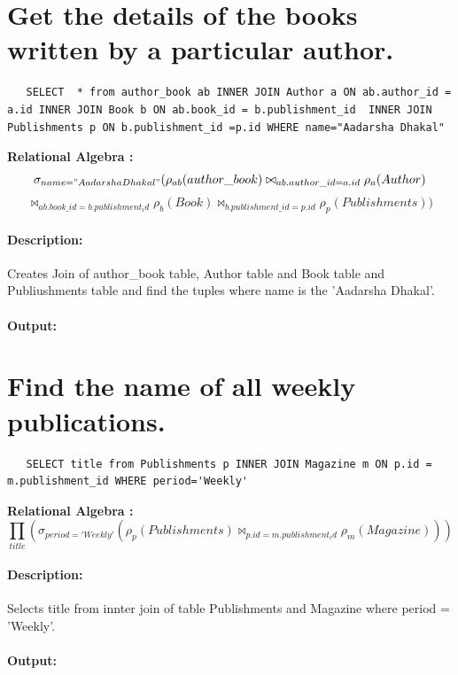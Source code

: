 \documentclass{report}
\begin{document}
\section{Get the details of the books written by a particular author.}
\begin{lstlisting}
   SELECT  * from author_book ab INNER JOIN Author a ON ab.author_id = a.id INNER JOIN Book b ON ab.book_id = b.publishment_id  INNER JOIN Publishments p ON b.publishment_id =p.id WHERE name="Aadarsha Dhakal"
\end{lstlisting}
\vspace{0.5cm}
\textbf{Relational Algebra :} \[ \sigma_{name = "Aadarsha Dhakal"}  ( \rho_{ab}(author\_book) \bowtie_{ab.author\_id = a.id} \rho_a(Author)\]\[ \bowtie_{ab.book\_id = b.publishment_id} \rho_b(Book) \bowtie_{b.publishment\_id = p.id} \rho_p(Publishments) ) \]
\paragraph{Description: }
Creates Join of author\_book table, Author table and Book table and Publiushments table and find the tuples where name is the 'Aadarsha Dhakal'.

\paragraph{Output: }




\section{Find the name of all weekly publications. }
\begin{lstlisting}
   SELECT title from Publishments p INNER JOIN Magazine m ON p.id = m.publishment_id WHERE period='Weekly'
\end{lstlisting}
\vspace{0.5cm}
\textbf{Relational Algebra :} \[ \prod_{title}( \sigma_{period='Weekly'}  ( \rho_p(Publishments) \bowtie_{p.id = m.publishment_id}  \rho_m(Magazine)))   \]
\paragraph{Description: }
Selects title from innter join of table Publishments and Magazine where period = 'Weekly'.

\paragraph{Output: }
\end{document}
